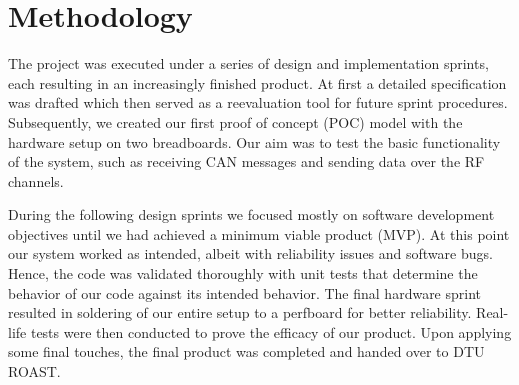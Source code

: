 \documentclass[a4paper,conference]{IEEEtran}
\begin{document}
\section{Methodology}
The project was executed under a series of design and implementation sprints, each resulting in an increasingly finished product. At first a detailed specification was drafted which then served as a reevaluation tool for future sprint procedures. 
Subsequently, we created our first proof of concept (POC) model with the hardware setup on two breadboards. Our aim was to test the basic functionality of the system, such as receiving CAN messages and sending data over the RF channels. 

During the following design sprints we focused mostly on software development objectives until we had achieved a minimum viable product (MVP). At this point our system worked as intended, albeit with reliability issues and software bugs. Hence, the code was validated thoroughly with unit tests that determine the behavior of our code against its intended behavior. The final hardware sprint resulted in soldering of our entire setup to a perfboard for better reliability. Real-life tests were then conducted to prove the efficacy of our product. Upon applying some final touches, the final product was completed and handed over to DTU ROAST. 

\end{document}
